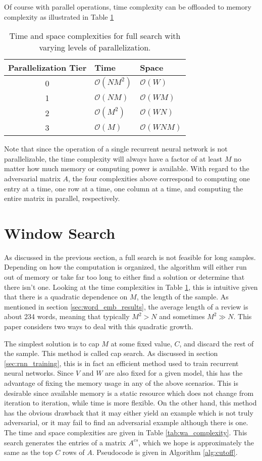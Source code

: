 Of course with parallel operations, time complexity can be offloaded to memory complexity as illustrated in Table \ref{tab:fs_complexity}
\begin{table}
\centering
\begin{tabular}{ |c|l|l| } 
 \hline
 Parallelization Tier & Time & Space \\ \hline
 0&$\mathcal{O}(NM^2)$ & $\mathcal{O}(W)$ \\ %
 1&$\mathcal{O}(NM)$ & $\mathcal{O}(WM)$ \\ %
 2&$\mathcal{O}(M^2)$ & $\mathcal{O}(WN)$ \\ %
 3&$\mathcal{O}(M)$ & $\mathcal{O}(WNM)$ \\ \hline
\end{tabular}
\caption{Time and space complexities for full search with varying levels of parallelization.}
\label{tab:fs_complexity}
\end{table}
Note that since the operation of a single recurrent neural network is not parallelizable, the time complexity will always have a factor of at least $M$ no matter how much memory or computing power is available.  With regard to the adversarial matrix $A$, the four complexities above correspond to computing one entry at a time, one row at a time, one column at a time, and computing the entire matrix in parallel, respectively.  

\section{Window Search}
As discussed in the previous section, a full search is not feasible for long samples.  Depending on how the computation is organized, the algorithm will either run out of memory or take far too long to either find a solution or determine that there isn't one.  Looking at the time complexities in Table \ref{tab:fs_complexity}, this is intuitive given that there is a quadratic dependence on $M$, the length of the sample.  As mentioned in section \ref{sec:word_emb_results}, the average length of a review is about 234 words, meaning that typically $M^2 > N$ and sometimes $M^2 \gg N$.  This paper considers two ways to deal with this quadratic growth.

The simplest solution is to cap $M$ at some fixed value, $C$, and discard the rest of the sample.  This method is called cap search.  As discussed in section \ref{sec:rnn_training}, this is in fact an efficient method used to train recurrent neural networks.  Since $V$ and $W$ are also fixed for a given model, this has the advantage of fixing the memory usage in any of the above scenarios.  This is desirable since available memory is a static resource which does not change from iteration to iteration, while time is more flexible.  On the other hand, this method has the obvious drawback that it may either yield an example which is not truly adversarial, or it may fail to find an adversarial example although there is one.  The time and space complexities are given in Table \ref{tab:wa_complexity}.  This search generates the entries of a matrix $A^{cs}$, which we hope is approximately the same as the top $C$ rows of $A$.  Pseudocode is given in Algorithm \ref{alg:cutoff}.

